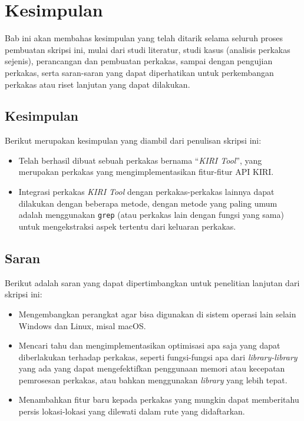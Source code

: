 \chapter{Kesimpulan}
\label{chap:conclusion}

Bab ini akan membahas kesimpulan yang telah ditarik selama seluruh proses pembuatan skripsi ini, mulai dari studi literatur, studi kasus (analisis perkakas sejenis), perancangan dan pembuatan perkakas, sampai dengan pengujian perkakas, serta saran-saran yang dapat diperhatikan untuk perkembangan perkakas atau riset lanjutan yang dapat dilakukan.

\section{Kesimpulan}
\label{chap:conclusion-endnotes}

Berikut merupakan kesimpulan yang diambil dari penulisan skripsi ini:

\begin{itemize}
	\item Telah berhasil dibuat sebuah perkakas bernama ``\textit{KIRI Tool}'', yang merupakan perkakas \cl yang mengimplementasikan fitur-fitur API KIRI.
	\item Integrasi perkakas \textit{KIRI Tool} dengan perkakas-perkakas \cl lainnya dapat dilakukan dengan beberapa metode, dengan metode yang paling umum adalah menggunakan \verb|grep| (atau perkakas lain dengan fungsi yang sama) untuk mengekstraksi aspek tertentu dari keluaran perkakas.
\end{itemize}

\section{Saran}
\label{chap:conclusion-feedbacks}

Berikut adalah saran yang dapat dipertimbangkan untuk penelitian lanjutan dari skripsi ini:

\begin{itemize}
	\item Mengembangkan perangkat agar bisa digunakan di sistem operasi lain selain Windows dan Linux, misal macOS.
	\item Mencari tahu dan mengimplementasikan optimisasi apa saja yang dapat diberlakukan terhadap perkakas, seperti fungsi-fungsi apa dari \textit{library-library} yang ada yang dapat mengefektifkan penggunaan memori atau kecepatan pemrosesan perkakas, atau bahkan menggunakan \textit{library} yang lebih tepat.
	\item Menambahkan fitur baru kepada perkakas yang mungkin dapat memberitahu persis lokasi-lokasi yang dilewati dalam rute yang didaftarkan.
\end{itemize}